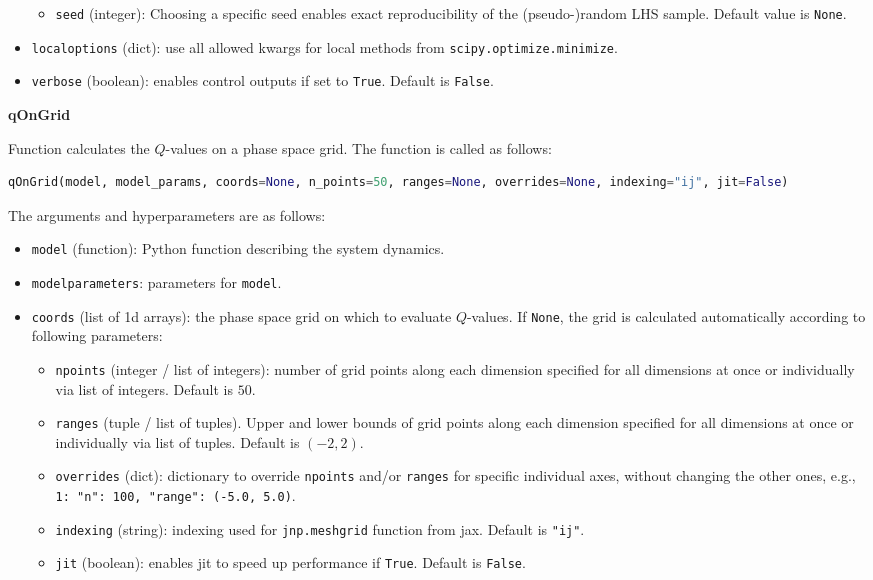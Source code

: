 \documentclass{article}
\theoremstyle{definition}
\begin{document}
\begin{refsection}
\begin{itemize}
\begin{itemize}
        \item {\tt seed} (integer): Choosing a specific seed enables exact reproducibility of the (pseudo-)random LHS sample. Default value is {\tt None}.
    \end{itemize}
    \item {\tt local\textunderscore options} (dict): use all allowed kwargs for local methods from {\tt scipy.optimize.minimize}.
    \item {\tt verbose} (boolean): enables control outputs if set to {\tt True}. Default is {\tt False}.
\end{itemize}

\noindent \textbf{qOnGrid}

Function calculates the $Q$-values on a phase space grid. The function is called as follows:

\begin{lstlisting}[language=Python]
qOnGrid(model, model_params, coords=None, n_points=50, ranges=None, overrides=None, indexing="ij", jit=False)
\end{lstlisting}

The arguments and hyperparameters are as follows:

\begin{itemize}
    \item {\tt model} (function): Python function describing the system dynamics.
    \item {\tt model\textunderscore parameters}: parameters for {\tt model}.
    \item {\tt coords} (list of 1d arrays): the phase space grid on which to evaluate $Q$-values. If {\tt None}, the grid is calculated automatically according to following parameters:
    \begin{itemize}
        \item {\tt n\textunderscore points} (integer / list of integers): number of grid points along each dimension specified for all dimensions at once or individually via list of integers. Default is $50$.
        \item {\tt ranges} (tuple / list of tuples). Upper and lower bounds of grid points along each dimension specified for all dimensions at once or individually via list of tuples. Default is $(-2,2)$.
        \item {\tt overrides} (dict): dictionary to override {\tt n\textunderscore points} and/or {\tt ranges} for specific individual axes, without changing the other ones, e.g., {\tt {1: {"n": 100, "range": (-5.0, 5.0)}}}.
        \item {\tt indexing} (string): indexing used for {\tt jnp.meshgrid} function from jax. Default is {\tt "ij"}.
        \item {\tt jit} (boolean): enables jit to speed up performance if {\tt True}. Default is {\tt False}.
    \end{itemize}


\end{itemize}
\end{refsection}
\end{document}
